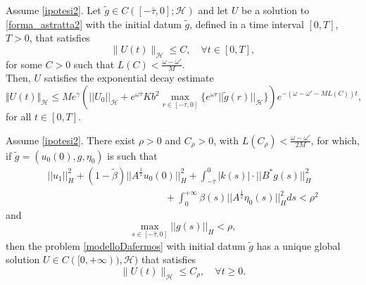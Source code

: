\documentclass[10pt,a4paper]{amsart}
\renewcommand{\geq}{\geqslant}
\renewcommand{\leq}{\leqslant}
\renewcommand{\le}{\leqslant}
\begin{document}
\begin{Theorem}\label{StabilityAbstract}
Assume \eqref{ipotesi2}. Let $\tilde g\in C([-\bar\tau, 0];\mathcal{H})$ and let $U$ be a solution to \eqref{forma_astratta2} with the initial datum $\tilde{g}$, defined in a time interval $[0,T]$, $T>0$, that satisfies 
\begin{equation}\label{boundedsolution}
	\lVert U(t)\rVert_{\mathcal{H}}\leq C,\quad \forall t\in [0,T],
\end{equation}
for some $C>0$ such that $L(C)<\frac{\omega-\omega'}{M}$.
\\Then, $U$ satisfies the exponential decay estimate 
\begin{equation}
\label{stimaesponenziale}
\Vert  U(t)\Vert_{\mathcal H}\le Me^{\gamma}\left(||U_0||_{\mathcal H}+e^{\omega\bar{\tau}}Kb^2\max_{r\in[-\bar{\tau},0]}\{e^{\omega r}||\tilde{g}(r)||_{\mathcal H}\}\right)e^{-(\omega-\omega'-ML(C))t},
\end{equation}
for all $t\in [0,T]$.
\end{Theorem}

\begin{Theorem}\label{teorema2.5}
	Assume \eqref{ipotesi2}. There exist $\rho>0$ and $C_{\rho}>0$, with $L(C_{\rho})<\frac{\omega-\omega'}{2M}$, for which, if $\tilde g=(u_0(0),g,\eta_0)$ is such that
	\begin{equation}\label{smallness}
		\begin{array}{l}
			\displaystyle{||u_1||^2_{H}+(1-\tilde{\beta})||A^{\frac{1}{2}}u_0(0)||^2_{H}+\int_{-\bar\tau}^0|k(s)|\cdot||B^*g(s)||^2_{H}}\\
			\displaystyle{\hspace{5cm}+\int_{0}^{+\infty}\beta(s)||A^{\frac{1}{2}}\eta_0(s)||^2_{H}ds<\rho^2}
\end{array}
\end{equation}
and
\begin{equation}\label{smallness_bis}
			\displaystyle{\max_{s\in [-\bar{\tau},0]}||g(s)||_{H}<\rho,}
	\end{equation}
then the problem \eqref{modelloDafermos} with  initial datum $\tilde{g}$ has a unique global solution $U\in C([0,+\infty)),\mathcal{H})$ that satisfies
\begin{equation}\label{boundedsol2}
	\lVert U(t)\rVert_{\mathcal{H}}\leq C_{\rho},\quad \forall t\geq 0.
\end{equation} 
\end{Theorem}
\end{document}
